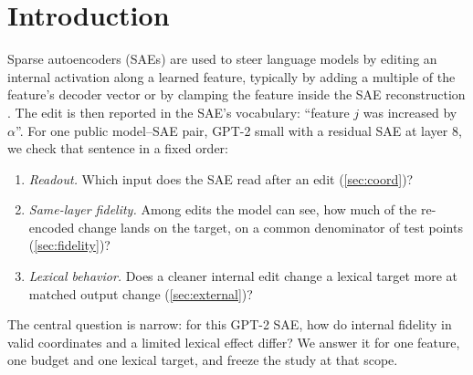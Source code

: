 \documentclass{article}
\theoremstyle{plain}
\theoremstyle{definition}
\theoremstyle{remark}
\begin{document}
\section{Introduction}
\label{sec:intro}

Sparse autoencoders (SAEs) are used to steer language models by editing an internal
activation along a learned feature, typically by adding a multiple of the feature's decoder
vector or by clamping the feature inside the SAE reconstruction
\citep{templeton2024scaling,obrien2025steering,wu2025axbench}. The edit is then reported in
the SAE's vocabulary: ``feature $j$ was increased by $\alpha$''. For one public model--SAE
pair, GPT-2 small with a residual SAE at layer 8, we check that sentence in a fixed order:
\begin{enumerate}
  \item[(a)] \emph{Readout.} Which input does the SAE read after an edit (\cref{sec:coord})?
  \item[(b)] \emph{Same-layer fidelity.} Among edits the model can see, how much of the
  re-encoded change lands on the target, on a common denominator of test points
  (\cref{sec:fidelity})?
  \item[(c)] \emph{Lexical behavior.} Does a cleaner internal edit change a lexical target
  more at matched output change (\cref{sec:external})?
\end{enumerate}
The central question is narrow: for this GPT-2 SAE, how do internal fidelity in valid
coordinates and a limited lexical effect differ? We answer it for one feature, one budget
and one lexical target, and freeze the study at that scope.
\end{document}
